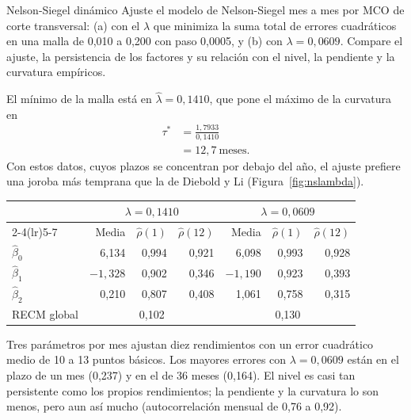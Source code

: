 \begin{ejresuelto}{Nelson-Siegel dinámico}\label{ej:ns}
\enunciado Ajuste el modelo de Nelson-Siegel mes a mes por MCO de corte transversal: (a) con el $\lambda$ que minimiza la suma
total de errores cuadráticos en una malla de 0,010 a 0,200 con paso 0,0005, y (b) con $\lambda=0{,}0609$. Compare el ajuste, la
persistencia de los factores y su relación con el nivel, la pendiente y la curvatura empíricos.

\solucion
{} El mínimo de la malla está en $\hat\lambda=0{,}1410$, que pone el máximo de la curvatura en
\begin{align*}
  \tau^* &= \frac{1{,}7933}{0{,}1410}\\
         &= 12{,}7\ \text{meses}.
\end{align*}
Con estos datos, cuyos plazos se concentran por debajo del año, el ajuste prefiere una joroba más temprana que la de
Diebold y Li (Figura~\ref{fig:nslambda}).

\begin{center}\small
\begin{tabular}{@{}lrrrrrr@{}}
\toprule
 & \multicolumn{3}{c}{$\lambda=0{,}1410$} & \multicolumn{3}{c}{$\lambda=0{,}0609$} \\
\cmidrule(lr){2-4}\cmidrule(lr){5-7}
 & Media & $\hat\rho(1)$ & $\hat\rho(12)$ & Media & $\hat\rho(1)$ & $\hat\rho(12)$ \\
\midrule
$\hat\beta_0$ & 6,134 & 0,994 & 0,921 & 6,098 & 0,993 & 0,928 \\
$\hat\beta_1$ & $-1{,}328$ & 0,902 & 0,346 & $-1{,}190$ & 0,923 & 0,393 \\
$\hat\beta_2$ & 0,210 & 0,807 & 0,408 & 1,061 & 0,758 & 0,315 \\
\midrule
RECM global & \multicolumn{3}{c}{0,102} & \multicolumn{3}{c}{0,130} \\
\bottomrule
\end{tabular}
\end{center}
Tres parámetros por mes ajustan diez rendimientos con un error cuadrático medio de 10 a 13 puntos básicos. Los mayores
errores con $\lambda=0{,}0609$ están en el plazo de un mes (0,237) y en el de 36 meses (0,164). El nivel es casi tan persistente
como los propios rendimientos; la pendiente y la curvatura lo son menos, pero aun así mucho (autocorrelación mensual de 0,76 a 0,92).


\end{ejresuelto}
